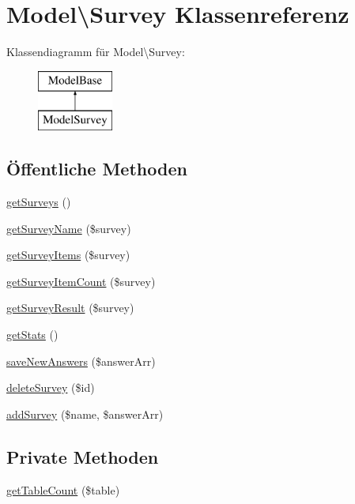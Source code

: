 \hypertarget{class_model_1_1_survey}{\section{Model\textbackslash{}Survey Klassenreferenz}
\label{class_model_1_1_survey}
}
Klassendiagramm für Model\textbackslash{}Survey\-:\begin{figure}[H]
\begin{center}
\leavevmode
\includegraphics[height=2.000000cm]{class_model_1_1_survey}
\end{center}
\end{figure}
\subsection*{Öffentliche Methoden}
\begin{DoxyCompactItemize}
\item 
\hyperlink{class_model_1_1_survey_a259373a6fdcae5796fc6e14586c98474}{get\-Surveys} ()
\item 
\hyperlink{class_model_1_1_survey_a85d138e55d090b11ba406db39f7d2e72}{get\-Survey\-Name} (\$survey)
\item 
\hyperlink{class_model_1_1_survey_a7f2d5fba208ba0f2ec426db9b9075115}{get\-Survey\-Items} (\$survey)
\item 
\hyperlink{class_model_1_1_survey_ac4b8b489fe806c31bd05d8ec626aae16}{get\-Survey\-Item\-Count} (\$survey)
\item 
\hyperlink{class_model_1_1_survey_a3423f530767905dd0b52858c70d82877}{get\-Survey\-Result} (\$survey)
\item 
\hyperlink{class_model_1_1_survey_ae8dbded81f45b3d84c061bb1bf5ba97f}{get\-Stats} ()
\item 
\hyperlink{class_model_1_1_survey_a39a47b914740e87bc133a72c4721b018}{save\-New\-Answers} (\$answer\-Arr)
\item 
\hyperlink{class_model_1_1_survey_a80276047e075565b781c60d7ac25b3a6}{delete\-Survey} (\$id)
\item 
\hyperlink{class_model_1_1_survey_acf9f6e213e5fd9a31a998db3ddf9026c}{add\-Survey} (\$name, \$answer\-Arr)
\end{DoxyCompactItemize}
\subsection*{Private Methoden}
\begin{DoxyCompactItemize}
\item 
\hyperlink{class_model_1_1_survey_a5c2c5d322a7ae1786acb783f472cc074}{get\-Table\-Count} (\$table)
\end{DoxyCompactItemize}

